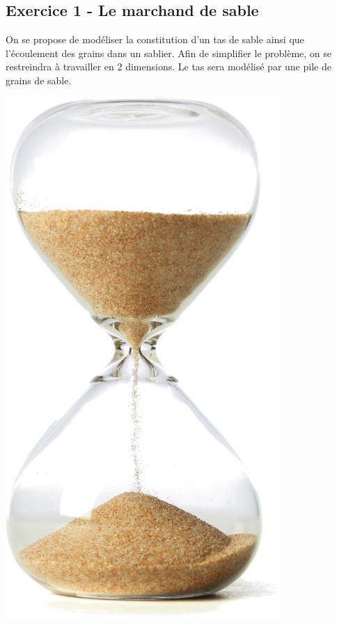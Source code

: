 \documentclass[10pt,fleqn]{article} %
\begin{document}

\vspace{7cm}
\pagestyle{fancy}
\thispagestyle{plain}


\def\columnseprulecolor{\color{ocre}}
\setlength{\columnseprule}{0.4pt} 
\begin{multicols}{2}

\section*{Exercice 1 - Le marchand de sable}
\begin{minipage}[c]{.75\linewidth}
On se propose de modéliser la constitution d'un tas de sable ainsi que l'écoulement des grains dans un sablier. Afin de simplifier le problème, on se restreindra à travailler en 2 dimensions. Le tas sera modélisé par une pile de grains de sable. 
\end{minipage}
\hfill
\begin{minipage}[c]{.2\linewidth}
\begin{center}
\includegraphics[width=.8\linewidth]{images/sablier_p}
\end{center}
\end{minipage}


\end{multicols}
\end{document}
